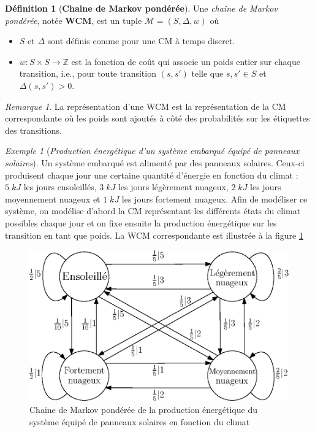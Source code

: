 \documentclass[12pt,a4paper]{report}
\theoremstyle{definition}%
\newtheorem{definition}{Définition}[chapter]
\theoremstyle{remark}
\newtheorem{example}{Exemple}[chapter]
\newtheorem{remark}{Remarque}[chapter]
\newcommand{\ie}{i.e., }
\let\labelitemi\labelitemii
\begin{document}
\begin{definition}[\textbf{Chaine de Markov pondérée}]
	Une \textit{chaîne de Markov pondérée}, notée \textbf{WCM}, est un tuple $\mathcal{M} = (S, \Delta, w)$ où
	\begin{itemize}
		\renewcommand{\labelitemi}{\tiny$\bullet$}
		\item $S$ et $\Delta$ sont définis comme pour une CM à temps discret.
		\item $w: S\times S \rightarrow \mathbb{Z}$ est la fonction de coût qui associe un poids entier sur chaque  transition, \ie pour toute transition $(s, s')$ telle que $s, s' \in S$ et $\Delta(s, s') > 0$.
	\end{itemize}
\end{definition}

\begin{remark}
	La représentation d'une WCM est la représentation de la CM correspondante où les poids sont ajoutés à côté des probabilités sur les étiquettes des transitions.
\end{remark}
\begin{example}[\textit{Production énergétique d'un système embarqué équipé de panneaux solaires}]\label{solar-pannel-example}
	Un système embarqué est alimenté par des panneaux solaires. Ceux-ci produisent chaque jour une certaine quantité d'énergie en fonction du climat : $5\; kJ$ les jours ensoleillés, $3\; kJ$ les jours légèrement nuageux, $2\; kJ$ les jours moyennement nuageux et $1\; kJ$ les jours fortement nuageux. Afin de modéliser ce système, on modélise d'abord la CM représentant les différents états du climat possibles chaque jour et on fixe ensuite la production énergétique sur les transition en tant que poids. La WCM correspondante est illustrée à la figure \ref{solar-pannel-1}
	
	\begin{figure}[H]
		\centering
		\includegraphics[scale=0.9]{figures/weather-solar-pannel.eps}
		\caption{Chaine de Markov pondérée de la production énergétique du système équipé de panneaux solaires en fonction du climat}
		\label{solar-pannel-1}
	\end{figure}
\end{example}
\end{document}
